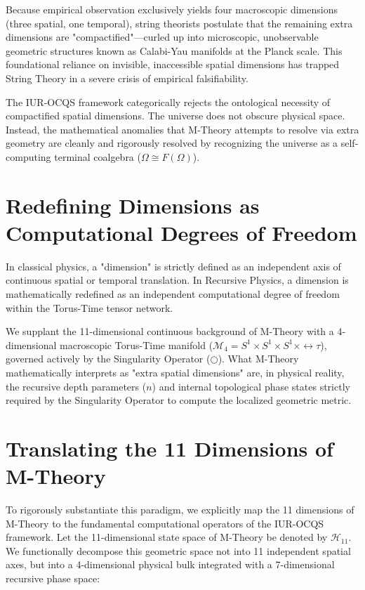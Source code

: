 \documentclass[12pt,openany]{book}
\begin{document}
Because empirical observation exclusively yields four macroscopic dimensions (three spatial, one temporal), string theorists postulate that the remaining extra dimensions are "compactified"---curled up into microscopic, unobservable geometric structures known as Calabi-Yau manifolds at the Planck scale. This foundational reliance on invisible, inaccessible spatial dimensions has trapped String Theory in a severe crisis of empirical falsifiability.

The IUR-OCQS framework categorically rejects the ontological necessity of compactified spatial dimensions. The universe does not obscure physical space. Instead, the mathematical anomalies that M-Theory attempts to resolve via extra geometry are cleanly and rigorously resolved by recognizing the universe as a self-computing terminal coalgebra ($\Omega \cong F(\Omega)$).

\section{Redefining Dimensions as Computational Degrees of Freedom}
In classical physics, a "dimension" is strictly defined as an independent axis of continuous spatial or temporal translation. In Recursive Physics, a dimension is mathematically redefined as an independent computational degree of freedom within the Torus-Time tensor network. 

We supplant the 11-dimensional continuous background of M-Theory with a 4-dimensional macroscopic Torus-Time manifold ($\mathcal{M}_4 = S^1 \times S^1 \times S^1 \times \leftrightarrow\tau$), governed actively by the Singularity Operator ($\bigcirc$). What M-Theory mathematically interprets as "extra spatial dimensions" are, in physical reality, the recursive depth parameters ($n$) and internal topological phase states strictly required by the Singularity Operator to compute the localized geometric metric.

\section{Translating the 11 Dimensions of M-Theory}
To rigorously substantiate this paradigm, we explicitly map the 11 dimensions of M-Theory to the fundamental computational operators of the IUR-OCQS framework. Let the 11-dimensional state space of M-Theory be denoted by $\mathcal{H}_{11}$. We functionally decompose this geometric space not into 11 independent spatial axes, but into a 4-dimensional physical bulk integrated with a 7-dimensional recursive phase space:
\end{document}

